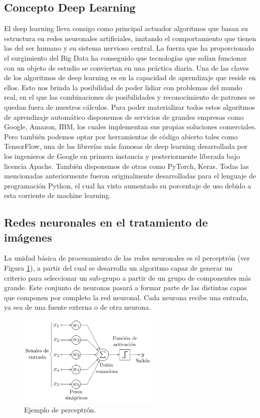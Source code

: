 \subsection{Concepto Deep Learning}\label{subsec:concepto-deep-learning}
El deep learning lleva consigo como principal actuador algoritmos que basan su estructura en redes neuronales artificiales, imitando el comportamiento que tienen las del ser humano y su sistema nervioso central.
La fuerza que ha proporcionado el surgimiento del Big Data ha conseguido que tecnologías que solían funcionar con un objeto de estudio se conviertan en una práctica
diaria.
Una de las claves de los algoritmos de deep learning es en la capacidad de aprendizaje que reside en ellos.
Esto nos brinda la posibilidad de poder lidiar con problemas del mundo real,
en el que las combinaciones de posibilidades y reconocimiento de patrones se quedan fuera de nuestros cálculos.
Para poder materializar todos estos algoritmos de aprendizaje automático disponemos de servicios de grandes empresas como Google, Amazon, IBM, los cuales
implementan sus propias soluciones comerciales.
Pero también podemos optar por herramientas de código abierto tales como TensorFlow, una de las librerías más famosas de deep learning desarrollada por los ingenieros de Google en primera instancia y posteriormente liberada bajo licencia Apache.
También disponemos de otras como PyTorch, Keras.
Todas las mencionadas anteriormente fueron originalmente desarrolladas para el lenguaje de programación Python, el cual ha visto aumentado su porcentaje de uso debido a esta corriente de
machine learning.

\subsection{Redes neuronales en el tratamiento de imágenes}\label{subsec:redes-neuronales-en-el-tratamiento-de-imágenes}
La unidad básica de procesamiento de las redes neuronales es el perceptrón (ver Figura \ref{fig:Perceptrón}), a partir del cual se desarrolla un algoritmo capaz de generar un criterio para seleccionar un sub-grupo a partir de un grupo de componentes más grande.
Este conjunto de neuronas pasará a formar parte de las distintas capas que componen por completo la red neuronal.
Cada neurona recibe una entrada, ya sea de una fuente externa o de otra neurona.

\begin{figure}[H]
    \centering
    \includegraphics[width=0.6\textwidth]{images/chapter1/perceptron.png}
    \caption{Ejemplo de perceptrón.}
    \label{fig:Perceptrón}
\end{figure}

